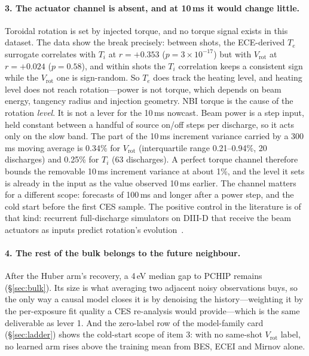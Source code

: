 \documentclass[10pt]{article}
\newcommand{\Ti}{\ensuremath{T_i}}
\newcommand{\Vrot}{\ensuremath{V_\mathrm{rot}}}
\begin{document}
\paragraph{3. The actuator channel is absent, and at 10\,ms it would change little.}
Toroidal rotation is set by injected torque, and no torque signal exists in this
dataset. The data show the break precisely: between shots, the ECE-derived $T_e$
surrogate correlates with \Ti{} at $r = +0.353$ ($p = 3\times10^{-17}$) but with
\Vrot{} at $r = +0.024$ ($p = 0.58$), and within shots the \Ti{} correlation keeps a
consistent sign while the \Vrot{} one is sign-random. So $T_e$ does track the heating
level, and heating level does not reach rotation---power is not torque, which depends
on beam energy, tangency radius and injection geometry. NBI torque is the cause of
the rotation \emph{level}. It is not a lever for the 10\,ms nowcast. Beam power is
a step input, held constant between a handful of source on/off steps per
discharge, so it acts only on the slow band. The part of the 10\,ms increment
variance carried by a 300\,ms moving average is 0.34\% for \Vrot{} (interquartile
range 0.21--0.94\%, 20 discharges) and 0.25\% for \Ti{} (63 discharges). A perfect
torque channel therefore bounds the removable 10\,ms increment variance at about
1\%, and the level it sets is already in the input as the value observed 10\,ms
earlier. The channel matters for a different scope: forecasts of 100\,ms and longer
after a power step, and the cold start before the first CES sample. The positive
control in the literature is of that kind: recurrent full-discharge simulators on
DIII-D that receive the beam actuators as inputs predict rotation's
evolution~\citep{Char2024FullShot}.

\paragraph{4. The rest of the bulk belongs to the future neighbour.}
After the Huber arm's recovery, a 4\,eV median gap to PCHIP remains
(\S\ref{sec:bulk}). Its size is what averaging two adjacent noisy observations buys,
so the only way a causal model closes it is by denoising the history---weighting it
by the per-exposure fit quality a CES re-analysis would provide---which is the same
deliverable as lever 1. And the zero-label row of the model-family card
(\S\ref{sec:ladder}) shows the cold-start scope of item 3: with no same-shot \Vrot{}
label, no learned arm rises above the training mean from BES, ECEI and Mirnov alone.
\end{document}
